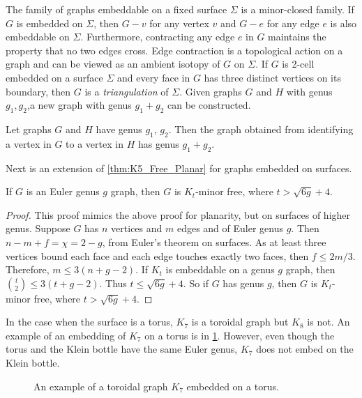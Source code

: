 The family of graphs embeddable on a fixed surface $\Sigma$ is a minor-closed family. If $G$ is embedded on $\Sigma$, then $G - v$ for any vertex $v$ and $G - e$ for any edge $e$ is also embeddable on $\Sigma$. Furthermore, contracting any edge $e$ in $G$ maintains the property that no two edges cross. Edge contraction is a topological action on a graph and can be viewed as an ambient isotopy of $G$ on $\Sigma$. 
If $G$ is 2-cell embedded on a surface $\Sigma$ and every face in $G$ has three distinct vertices on its boundary, then $G$ is a \textit{triangulation} of $\Sigma$. Given graphs $G$ and $H$ with genus $g_1, g_2$,a new graph with genus $g_1 + g_2$ can be constructed.
\begin{theorem}\label{thm:additivity_genus}
	Let graphs $G$ and $H$ have genus $g_1$, $g_2$. Then the graph obtained from identifying a vertex in $G$ to a vertex in $H$ has genus $g_1 + g_2$. 
\end{theorem}

Next is an extension of \cref{thm:K5_Free_Planar} for graphs embedded on surfaces. 

\begin{theorem}\label{thm:bounded_genus_kt_free}
	If \(G\) is an Euler genus \(g\) graph, then \(G\) is \(K_t\)-minor free, where \(t > \sqrt{6g} + 4\). 
\end{theorem}
\begin{proof}
	This proof mimics the above proof for planarity, but on surfaces of higher genus. 
	Suppose \(G\) has \(n\) vertices and \(m\) edges and of Euler genus $g$. Then \(n - m + f = \chi = 2-g\), from Euler's theorem on surfaces. As at least three vertices bound each face and each edge touches exactly two faces, then \(f \leq 2m/3\). Therefore, \(m \leq 3(n + g - 2)\). If \(K_t\) is embeddable on a genus \(g\) graph, then \(\binom{t}{2} \leq 3 (t + g - 2)\). Thus \(t \leq \sqrt{6g} + 4\). So if $G$ has genus \(g\), then $G$ is \(K_t\)-minor free, where \(t > \sqrt{6g} + 4\). 
\end{proof}

In the case when the surface is a torus, $K_7$ is a toroidal graph but $K_8$ is not. An example of an embedding of $K_7$ on a torus is in \cref{fig:k7_on_torus}. However, even though the torus and the Klein bottle have the same Euler genus, $K_7$ does not embed on the Klein bottle. 

\begin{figure}[h!]
	\centering
	
	\caption[Toroidal graph]{An example of a toroidal graph $K_7$ embedded on a torus.}\label{fig:k7_on_torus}
\end{figure}

